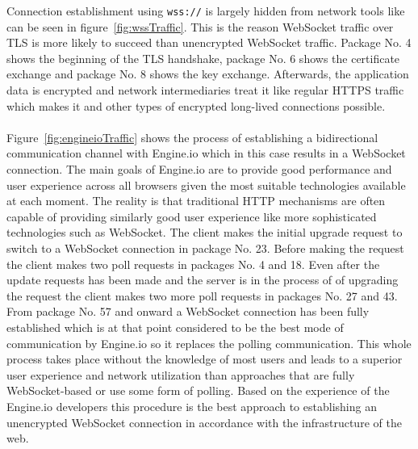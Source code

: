 \noindent
Connection establishment using \texttt{wss://} is largely hidden from network tools like can be seen in figure~\ref{fig:wssTraffic}. This is the reason WebSocket traffic over TLS is more likely to succeed than unencrypted WebSocket traffic. Package No. 4 shows the beginning of the TLS handshake, package No. 6 shows the certificate exchange and package No. 8 shows the key exchange. Afterwards, the application data is encrypted and network intermediaries treat it like regular HTTPS traffic which makes it and other types of encrypted long-lived connections possible.
\\ \\
Figure~\ref{fig:engineioTraffic} shows the process of establishing a bidirectional communication channel with Engine.io which in this case results in a WebSocket connection. The main goals of Engine.io are to provide good performance and user experience across all browsers given the most suitable technologies available at each moment. The reality is that traditional HTTP mechanisms are often capable of providing similarly good user experience like more sophisticated technologies such as WebSocket. The client makes the initial upgrade request to switch to a WebSocket connection in package No. 23. Before making the request the client makes two poll requests in packages No. 4 and 18. Even after the update requests has been made and the server is in the process of of upgrading the request the client makes two more poll requests in packages No. 27 and 43. From package No. 57 and onward a WebSocket connection has been fully established which is at that point considered to be the best mode of communication by Engine.io so it replaces the polling communication. This whole process takes place without the knowledge of most users and leads to a superior user experience and network utilization than approaches that are fully WebSocket-based or use some form of polling. Based on the experience of the Engine.io developers this procedure is the best approach to establishing an unencrypted WebSocket connection in accordance with the infrastructure of the web.

